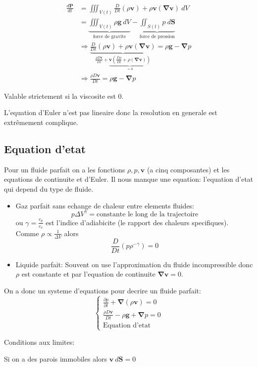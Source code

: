 \begin{align}
\frac{d\boldsymbol{P}}{dt} & =\iiint _{V(t)} \frac{D}{Dt}(\rho \boldsymbol{v})+\rho \boldsymbol{v}(\boldsymbol{\nabla v})~dV \\
 & =\underbrace{ \iiint _{V(t)} \rho \boldsymbol{g}~dV }_{ \text{force de gravite} } -\underbrace{ \iint _{S(t)}p~d\boldsymbol{S} }_{ \text{force de pression} }\\
 & \Rightarrow \underbrace{ \frac{D}{Dt}(\rho \boldsymbol{v})+\rho \boldsymbol{v}(\boldsymbol{\nabla v}) }_{ \frac{\rho D\boldsymbol{v}}{Dt}+\underbrace{ \boldsymbol{v}\left( \frac{D\rho}{Dt} +\rho(\boldsymbol{\nabla v})  \right) }_{ =0 }}=\rho \boldsymbol{g}-\boldsymbol{\nabla}p \\
 & \Rightarrow \frac{\rho D\boldsymbol{v}}{Dt}=\rho \boldsymbol{g}-\boldsymbol{\nabla}p
\end{align}

\begin{remark}
Valable strictement si la viscosite est 0. 
\end{remark}
\begin{remark}
L'equation d'Euler n'est pas lineaire donc la resolution en generale est extrêmement complique.
\end{remark}

\subsection{Equation d'etat}

Pour un fluide parfait on a les fonctions $\rho,p,\boldsymbol{v}$ (a cinq composantes) et les equations de continuite et d'Euler. Il nous manque une equation: l'equation d'etat qui depend du type de fluide.

\begin{itemize}
\item Gaz parfait sans echange de chaleur entre elements fluides: 
$$
p\Delta V^{\gamma}=\text{constante le long de la trajectoire}
$$
ou $\gamma=\frac{c_{p}}{c_{v}}$ est l'indice d'adiabicite (le rapport des chaleurs specifiques). Comme $\rho \propto \frac{1}{\Delta V}$ alors 
$$
\frac{D}{Dt}(p\rho^{-\gamma})=0
$$
\item Liquide parfait: Souvent on use l'approximation du fluide incompressible donc $\rho$ est constante et par l'equation de continuite $\boldsymbol{\nabla v}=0$.
\end{itemize}

On a donc un systeme d'equations pour decrire un fluide parfait:
$$
\begin{cases}
\frac{ \partial p }{ \partial t } +\boldsymbol{\nabla}(\rho \boldsymbol{v})=0 \\
\frac{\rho D\boldsymbol{v}}{Dt}-\rho \boldsymbol{g}+\boldsymbol{\nabla}p=0 \\
\text{Equation d'etat}
\end{cases}
$$

Conditions aux limites:
\begin{example}
Si on a des parois immobiles alors $\boldsymbol{v}~d\boldsymbol{S}=0$
\end{example}

